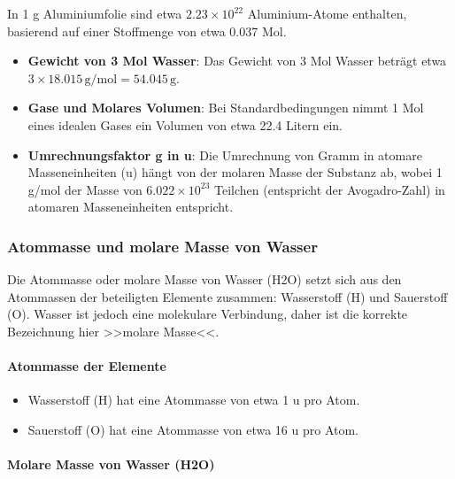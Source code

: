 \documentclass{vorlage-design-main}
\begin{document}
In 1 g Aluminiumfolie sind etwa $2.23 \times 10^{22}$ Aluminium-Atome
enthalten, basierend auf einer Stoffmenge von etwa 0.037 Mol.

\begin{itemize}

\item
  \textbf{Gewicht von 3 Mol Wasser}: Das Gewicht von 3 Mol Wasser
  beträgt etwa $3 \times 18.015 \, \text{g/mol} = 54.045 \, \text{g}$.
\item
  \textbf{Gase und Molares Volumen}: Bei Standardbedingungen nimmt 1 Mol
  eines idealen Gases ein Volumen von etwa 22.4 Litern ein.
\item
  \textbf{Umrechnungsfaktor g in u}: Die Umrechnung von Gramm in atomare
  Masseneinheiten (u) hängt von der molaren Masse der Substanz ab, wobei
  1 g/mol der Masse von $6.022 \times 10^{23}$ Teilchen (entspricht
  der Avogadro-Zahl) in atomaren Masseneinheiten entspricht.
\end{itemize}

\hypertarget{atommasse-und-molare-masse-von-wasser}{%
\subsubsection{Atommasse und molare Masse von
Wasser}\label{atommasse-und-molare-masse-von-wasser}}

Die Atommasse oder molare Masse von Wasser (H2O) setzt sich aus den
Atommassen der beteiligten Elemente zusammen: Wasserstoff (H) und
Sauerstoff (O). Wasser ist jedoch eine molekulare Verbindung, daher ist
die korrekte Bezeichnung hier >>molare Masse<<.

\hypertarget{atommasse-der-elemente}{%
\paragraph{Atommasse der Elemente}\label{atommasse-der-elemente}}

\begin{itemize}

\item
  Wasserstoff (H) hat eine Atommasse von etwa 1 u pro Atom.
\item
  Sauerstoff (O) hat eine Atommasse von etwa 16 u pro Atom.
\end{itemize}

\hypertarget{molare-masse-von-wasser-h2o}{%
\paragraph{Molare Masse von Wasser
(H2O)}\label{molare-masse-von-wasser-h2o}}
\end{document}
